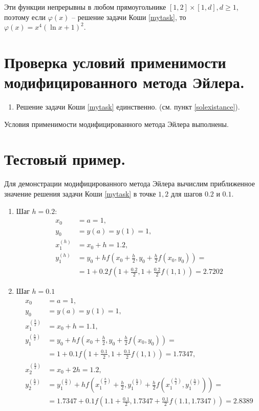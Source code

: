 \documentclass[a4paper, 12pt]{article}
\begin{document}
	Эти функции непрерывны в любом прямоугольнике $[1,2]\times[1,d], d\geq1$, поэтому если $\varphi(x)$ -- решение задачи Коши \eqref{mytask}, то $\varphi(x)=x^4(\ln x+1)^2$.
	
	\section{Проверка условий применимости модифицированного метода Эйлера.}
	
	\begin{enumerate}
		\item Решение задачи Коши \eqref{mytask} единственно. (см. пункт \ref{solexistance}).
	\end{enumerate}

	Условия применимости модифицированного метода Эйлера выполнены.
	
	\section{Тестовый пример.} \label{testexample}
	
	Для демонстрации модифицированного метода Эйлера вычислим приближенное значение решения задачи Коши \eqref{mytask} в точке $1,2$ для шагов $0.2$ и $0.1$.
	
	\begin{enumerate}
		\item Шаг $h=0.2$:
			\begin{equation*}
				\begin{aligned}
					x_0&=a=1,\\
					y_0&=y(a)=y(1)=1,\\
					x_1^{(h)}&=x_0+h=1.2,\\
					y_1^{(h)}&=y_0+hf(x_0+\frac{h}{2},y_0+\frac{h}{2}f(x_0,y_0))=\\&=1+0.2f(1+\frac{0.2}{2},1+\frac{0.2}{2}f(1,1))=2.7202
				\end{aligned}
			\end{equation*}	
		\item Шаг $h=0.1$
			\begin{equation*}
				\begin{aligned}
					x_0&=a=1,\\
					y_0&=y(a)=y(1)=1,\\
					x_1^{(\frac{h}{2})}&=x_0+h=1.1,\\
					y_1^{(\frac{h}{2})}&=y_0+hf(x_0+\frac{h}{2},y_0+\frac{h}{2}f(x_0,y_0))=\\&=1+0.1f(1+\frac{0.1}{2},1+\frac{0.1}{2}f(1,1))=1.7347,\\
					x_2^{(\frac{h}{2})}&=x_0+2h=1.2,\\
					y_2^{(\frac{h}{2})}&=y_1^{(\frac{h}{2})}+hf(x_1^{(\frac{h}{2})}+\frac{h}{2},y_1^{(\frac{h}{2})}+\frac{h}{2}f(x_1^{(\frac{h}{2})},y_1^{(\frac{h}{2})}))=\\&=1.7347+0.1f(1.1+\frac{0.1}{2},1.7347+\frac{0.1}{2}f(1.1,1.7347))=2.8389
				\end{aligned}
			\end{equation*}
	\end{enumerate} 
\end{document}
